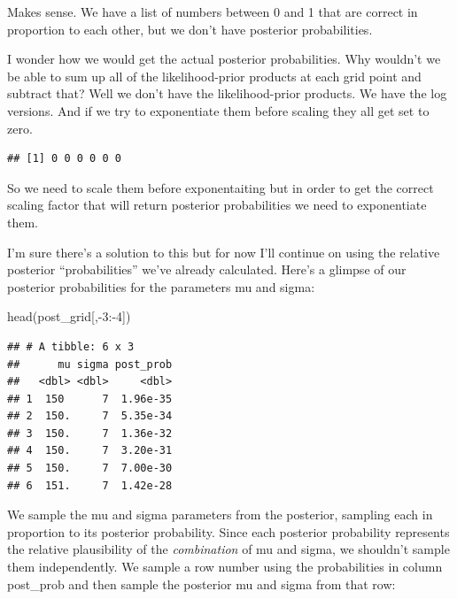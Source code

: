 \documentclass[
]{book}
\newenvironment{Shaded}{\begin{snugshade}}{\end{snugshade}}
\newcommand{\DecValTok}[1]{\textcolor[rgb]{0.00,0.00,0.81}{#1}}
\newcommand{\FunctionTok}[1]{\textcolor[rgb]{0.00,0.00,0.00}{#1}}
\newcommand{\NormalTok}[1]{#1}
\newcommand{\SpecialCharTok}[1]{\textcolor[rgb]{0.00,0.00,0.00}{#1}}
\begin{document}
Makes sense. We have a list of numbers between 0 and 1 that are correct in proportion to each other, but we don't have posterior probabilities.

I wonder how we would get the actual posterior probabilities. Why wouldn't we be able to sum up all of the likelihood-prior products at each grid point and subtract that? Well we don't have the likelihood-prior products. We have the log versions. And if we try to exponentiate them before scaling they all get set to zero.

\begin{Shaded}
\end{Shaded}

\begin{verbatim}
## [1] 0 0 0 0 0 0
\end{verbatim}

So we need to scale them before exponentaiting but in order to get the correct scaling factor that will return posterior probabilities we need to exponentiate them.

I'm sure there's a solution to this but for now I'll continue on using the relative posterior ``probabilities'' we've already calculated. Here's a glimpse of our posterior probabilities for the parameters mu and sigma:

\begin{Shaded}
\begin{Highlighting}[]
\FunctionTok{head}\NormalTok{(post\_grid[,}\SpecialCharTok{{-}}\DecValTok{3}\SpecialCharTok{:{-}}\DecValTok{4}\NormalTok{])}
\end{Highlighting}
\end{Shaded}

\begin{verbatim}
## # A tibble: 6 x 3
##      mu sigma post_prob
##   <dbl> <dbl>     <dbl>
## 1  150      7  1.96e-35
## 2  150.     7  5.35e-34
## 3  150.     7  1.36e-32
## 4  150.     7  3.20e-31
## 5  150.     7  7.00e-30
## 6  151.     7  1.42e-28
\end{verbatim}

We sample the mu and sigma parameters from the posterior, sampling each in proportion to its posterior probability. Since each posterior probability represents the relative plausibility of the \emph{combination} of mu and sigma, we shouldn't sample them independently. We sample a row number using the probabilities in column post\_prob and then sample the posterior mu and sigma from that row:
\end{document}
